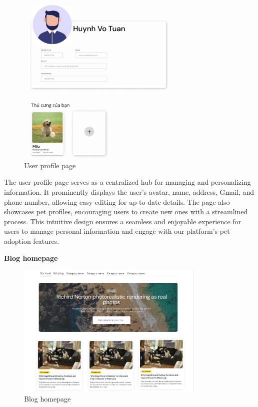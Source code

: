 \begin{figure}[H]
    \centering
    \includegraphics[width=0.7\textwidth]{Figures/user_profile_ui.jpg}
    \caption{User profile page}
\end{figure}


The user profile page serves as a centralized hub for managing and personalizing information. It prominently displays the user's avatar, name, address, Gmail, and phone number, allowing easy editing for up-to-date details. The page also showcases pet profiles, encouraging users to create new ones with a streamlined process. This intuitive design ensures a seamless and enjoyable experience for users to manage personal information and engage with our platform's pet adoption features.

\textbf{Blog homepage}
\begin{figure}[H]
    \centering
    \includegraphics[width=0.8\textwidth]{Figures/blog_ui.jpg}
    \caption{Blog homepage}
\end{figure}

